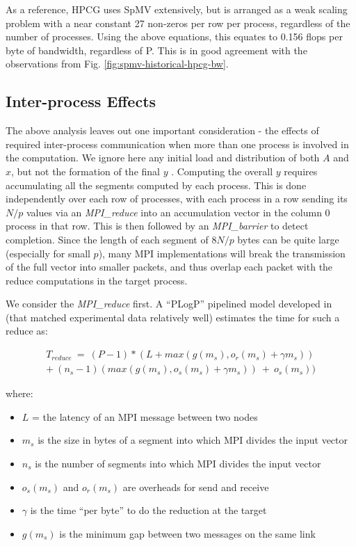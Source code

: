 As a reference, HPCG uses SpMV extensively, but is arranged as a weak scaling problem with a near constant 27 non-zeros per row per process, regardless of the number of processes. Using the above equations, this equates to 0.156 flops per byte of bandwidth, regardless of P. This is in good agreement with the observations from Fig. \ref{fig:spmv-historical-hpcg-bw}.

\subsection{Inter-process Effects}

The above analysis leaves out one important consideration - the effects of required inter-process communication when more than one process is involved in the computation. We ignore here any initial load and distribution of both $A$ and $x$, but not the formation of the final $y$ . Computing the overall $y$ requires accumulating all the segments computed by each process. This is done independently over each row of processes, with each process in a row sending its $N/p$ values via an \emph{MPI\_reduce} into an accumulation vector in the column 0 process in that row. This is then followed by an \emph{MPI\_barrier} to detect completion. Since the length of each segment of $8N/p$ bytes can be quite large (especially for small $p$), many MPI implementations will break the transmission of the full vector into smaller packets, and thus overlap each packet with the reduce computations in the target process.

We consider the \emph{MPI\_reduce} first. A ``PLogP'' pipelined model developed in \cite{techbib:Pjesivac-Grbovic:2007:PAM:1265235.1265248} (that matched experimental data relatively well) estimates the time for such a reduce as:
 
\begin{eqnarray}\label{eq:plogp}
T_{reduce}~=~(P-1)*(L+max(g(m_s),o_r(m_s)+\gamma m_s)) \\
+~(n_s-1)(max(g(m_s),o_s(m_s)+\gamma m_s))~+~o_s(m_s))
\end{eqnarray}

where:
\begin{itemize}
\item $L$ =  the latency of an MPI message between two nodes
\item $m_s$ is the size in bytes of a segment into which MPI divides the input vector
\item $n_s$ is the number of segments into which MPI divides the input vector
\item $o_s(m_s)$ and $o_r(m_s)$ are overheads for send and receive
\item $\gamma$ is the time ``per byte'' to do the reduction at the target
\item $g(m_s)$ is the minimum gap between two messages on the same link
\end{itemize}

